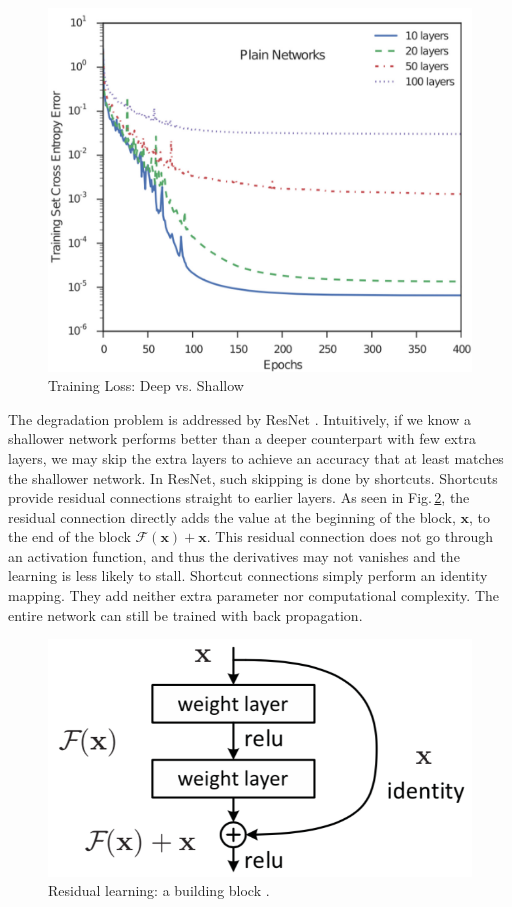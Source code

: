 \begin{figure}[h]
	\centering
	\includegraphics[scale=0.5]{Figs/deeploss.jpg}
    \caption{Training Loss: Deep vs. Shallow \cite{Srivastava2015}}
    \label{deeploss}
\end{figure}

The degradation problem is addressed by ResNet \citep{resnet}. Intuitively, if we know a shallower network performs better than a deeper counterpart with few extra layers, we may skip the extra layers to achieve an accuracy that at least matches the shallower network. In ResNet, such skipping is done by shortcuts. Shortcuts provide residual connections straight to earlier layers. As seen in Fig.\,\ref{residualblock}, the residual connection directly adds the value at the beginning of the block, $\mathbf{x}$, to the end of the block $\mathcal{F}(\mathbf{x})+\mathbf{x}$. This residual connection does not go through an activation function, and thus the derivatives may not vanishes and the learning is less likely to stall. Shortcut connections simply perform an identity mapping. They add neither extra parameter nor computational complexity. The entire network can still be trained with back propagation.

\begin{figure}[h]
	\centering
	\includegraphics[scale=0.5]{Figs/residualblock.png}
    \caption{Residual learning: a building block \cite{resnet}.}
    \label{residualblock}
\end{figure}



